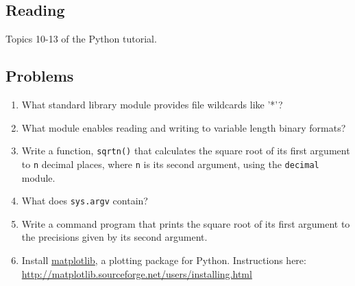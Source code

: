 \subsection{Reading}
Topics 10-13 of the Python tutorial.  

\subsection{Problems}

\begin{enumerate}
	\item What standard library module provides file wildcards like '*'?
	\item What module enables reading and writing to variable length binary formats?
	\item Write a function, \verb|sqrtn()| that calculates the square root of its first argument to \verb|n| decimal places, where \verb|n| is its second argument, using the \verb|decimal| module.
	\item What does \verb|sys.argv| contain?
	\item Write a command program that prints the square root of its first argument to the precisions given by its second argument.
	\item Install \href{http://matplotlib.sourceforge.net/}{matplotlib}, a plotting package for Python. Instructions here: \url{http://matplotlib.sourceforge.net/users/installing.html}

\end{enumerate}
